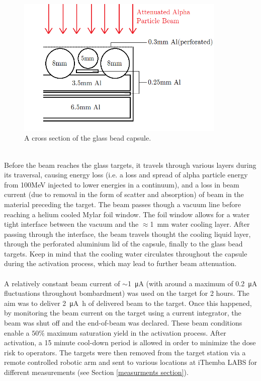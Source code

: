 \documentclass[]{article}
\begin{document}
\begin{figure}[h!]
	\includegraphics[width=10cm]{beadcapsuleScematic.png}
	\centering
	\caption{A cross section of the glass bead capsule.}
	\label{fig:capsuleSchematic}
\end{figure}~\\
Before the beam reaches the glass targets, it travels through various layers during its traversal, causing energy loss (i.e. a loss and spread of alpha particle energy from 100MeV injected to lower energies in a continuum), and a loss in beam current (due to removal in the form of scatter and absorption) of beam in the material preceding the target. The beam passes though a vacuum line before reaching a helium cooled Mylar foil window. The foil window allows for a water tight interface between the vacuum and the $\approx$\SI{1}{\milli \metre} water cooling layer. After passing through the interface, the beam travels thought the cooling liquid layer, through the perforated aluminium lid of the capsule, finally to the glass bead targets. Keep in mind that the cooling water circulates throughout the capsule during the activation process, which may lead to further beam attenuation.\\\\
A relatively constant beam current of $\sim$\SI{1}{\micro \ampere} (with around a maximum of \SI{0.2}{\micro \ampere} fluctuations throughout bombardment) was used on the target for 2 hours. The aim was to deliver \SI{2}{\micro \ampere \hour} of delivered beam to the target. Once this happened, by monitoring the beam current on the target using a current integrator, the beam was shut off and the end-of-beam was declared. These beam conditions enable a $50\%$ maximum saturation yield in the activation process\cite{proposal}. After activation, a 15 minute cool-down period is allowed in order to minimize the dose risk to operators. The targets were then removed from the target station via a remote controlled robotic arm and sent to various locations at iThemba LABS for different measurements (see Section \ref{measurments section}).
\end{document}
